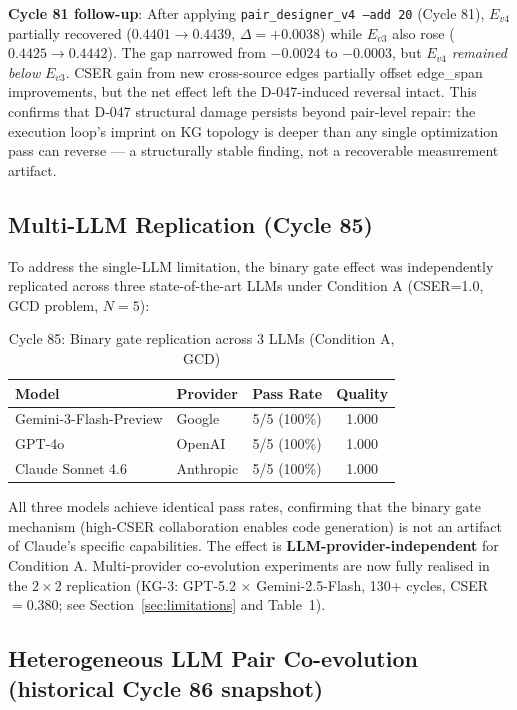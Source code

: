 \documentclass[12pt]{article}
\begin{document}
\noindent\textbf{Cycle 81 follow-up}: After applying \texttt{pair\_designer\_v4 --add 20}
(Cycle 81), $E_{v4}$ partially recovered ($0.4401 \to 0.4439$, $\Delta = +0.0038$) while
$E_{v3}$ also rose ($0.4425 \to 0.4442$). The gap narrowed from $-0.0024$ to $-0.0003$,
but $E_{v4}$ \emph{remained below} $E_{v3}$. CSER gain from new cross-source edges
partially offset edge\_span improvements, but the net effect left the D-047-induced
reversal intact. This confirms that D-047 structural damage persists beyond pair-level
repair: the execution loop's imprint on KG topology is deeper than any single
optimization pass can reverse --- a structurally stable finding, not a recoverable
measurement artifact.

\subsection{Multi-LLM Replication (Cycle 85)}

To address the single-LLM limitation, the binary gate effect was independently
replicated across three state-of-the-art LLMs under Condition A (CSER=1.0, GCD problem, $N=5$):

\begin{table}[h!]\centering\small
\begin{tabular}{llcc}
\toprule
Model & Provider & Pass Rate & Quality \\
\midrule
Gemini-3-Flash-Preview & Google & 5/5 (100\%) & 1.000 \\
GPT-4o & OpenAI & 5/5 (100\%) & 1.000 \\
Claude Sonnet 4.6 & Anthropic & 5/5 (100\%) & 1.000 \\
\bottomrule
\end{tabular}
\caption{Cycle 85: Binary gate replication across 3 LLMs (Condition A, GCD)}
\end{table}

All three models achieve identical pass rates, confirming that the binary gate
mechanism (high-CSER collaboration enables code generation) is not an artifact
of Claude's specific capabilities. The effect is \textbf{LLM-provider-independent}
for Condition A. Multi-provider co-evolution experiments are now fully realised
in the $2\times2$ replication (KG-3: GPT-5.2 $\times$ Gemini-2.5-Flash,
130+ cycles, CSER $= 0.380$; see Section~\ref{sec:limitations} and Table~1).

\subsection{Heterogeneous LLM Pair Co-evolution (historical Cycle 86 snapshot)}
\end{document}
